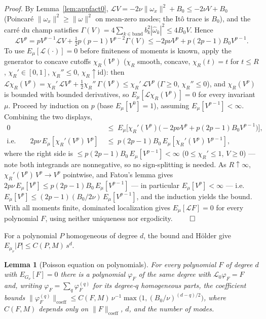 \documentclass[11pt]{article}
\newtheorem{lemma}[theorem]{Lemma}
\theoremstyle{remark}
\theoremstyle{plain}
\begin{document}
\emph{Proof.} By Lemma~\ref{lem:appfact0}, $\mathcal{L}V = -2\nu\|\omega_x\|^2 + B_0 \le -2\nu V + B_0$
(Poincar\'e $\|\omega_x\|^2 \ge \|\omega\|^2$ on mean-zero modes; the It\^o trace is $B_0$), and the
carr\'e du champ satisfies $\Gamma(V) = 4\sum_{k\in\text{band}}b_k^2|\hat\omega_k|^2 \le 4B_0 V$. Hence
\begin{equation}
  \mathcal{L}V^p = pV^{p-1}\mathcal{L}V + \tfrac12 p(p-1)V^{p-2}\Gamma(V) \le -2p\nu V^p + p(2p-1)B_0 V^{p-1}.
\end{equation}
To use $E_\mu[\mathcal{L}(\cdot)]=0$ before finiteness of moments is known, apply the generator to
concave cutoffs $\chi_R(V^p)$ ($\chi_R$ smooth, concave, $\chi_R(t)=t$ for $t\le R$,
$\chi_R'\in[0,1]$, $\chi_R''\le0$, $\chi_R\uparrow\mathrm{id}$): then $\mathcal{L}\chi_R(V^p)
= \chi_R'\,\mathcal{L}V^p + \tfrac12\chi_R''\,\Gamma(V^p) \le \chi_R'\,\mathcal{L}V^p$
($\Gamma \ge 0$, $\chi_R'' \le 0$), and
$\chi_R(V^p)$ is bounded with bounded derivatives, so $E_\mu[\mathcal{L}\chi_R(V^p)] = 0$ for every
invariant $\mu$. Proceed by induction on $p$ (base $E_\mu[V^0] = 1$), assuming
$E_\mu[V^{p-1}] < \infty$. Combining the two displays,
\begin{equation*}
\begin{aligned}
  0 &\;\le\; E_\mu\bigl[\chi_R'(V^p)\bigl(-2p\nu V^p + p(2p-1)B_0 V^{p-1}\bigr)\bigr],\\
  \text{i.e.}\qquad
  2p\nu\, E_\mu[\chi_R'(V^p)\,V^p] &\;\le\; p(2p-1)B_0\, E_\mu[\chi_R'(V^p)\,V^{p-1}],
\end{aligned}
\end{equation*}
where the right side is $\le p(2p-1)B_0\,E_\mu[V^{p-1}] < \infty$ ($0 \le \chi_R' \le 1$,
$V \ge 0$) --- note both integrands are nonnegative, so no sign-splitting is needed. As
$R\uparrow\infty$, $\chi_R'(V^p)\,V^p \to V^p$ pointwise, and Fatou's lemma gives
$2p\nu\,E_\mu[V^p] \le p(2p-1)B_0\,E_\mu[V^{p-1}]$ --- in particular $E_\mu[V^p] < \infty$
--- i.e.\ $E_\mu[V^p] \le (2p-1)(B_0/2\nu)\,E_\mu[V^{p-1}]$, and the induction yields the
bound. With all moments finite, dominated localization gives $E_\mu[\mathcal{L}F] = 0$ for
every polynomial $F$, using neither uniqueness nor ergodicity. $\qed$

For a polynomial $P$ homogeneous of degree $d$, the bound and H\"older give $E_{\mu_\nu}|P| \le C(P,M)\,s^d$.

\begin{lemma}[Poisson equation on polynomials]\label{lem:apppoisson}
For every polynomial $F$ of degree $d$ with $E_{G_\nu}[F] = 0$ there is a polynomial
$\varphi_F$ of the same degree
with $\mathcal{L}_0\varphi_F = F$ and, writing $\varphi_F = \sum_q \varphi_F^{(q)}$ for
its degree-$q$ homogeneous parts, the coefficient bounds
$\|\varphi_F^{(q)}\|_{\mathrm{coeff}} \le C(F,M)\,\nu^{-1}\max\!\bigl(1,(B_0/\nu)^{(d-q)/2}\bigr)$,
where $C(F,M)$ depends only on $\|F\|_{\mathrm{coeff}}$, $d$, and the number of modes.
\end{lemma}
\end{document}
